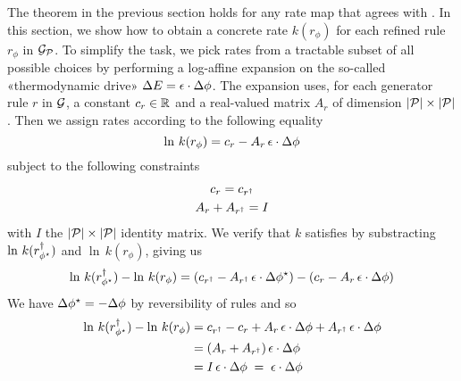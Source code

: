 The theorem in the previous section holds
for any rate map that agrees with .
In this section,
we show how to obtain a concrete rate $k(r_\phi)$
for each refined rule $r_\phi$ in $\mathcal{G}_{\mathcal{P}}$.
To simplify the task, %
we pick rates from a tractable subset of all possible choices
by performing a log-affine expansion on
the so-called «thermodynamic drive»
$\Delta E = \epsilon \cdot \Delta\phi$.
%
The expansion uses,
for each generator rule $r$ in $\mathcal{G}$,
a constant $c_r \in \mathbb{R}$
and a real-valued matrix $A_r$
of dimension $\left\lvert \mathcal{P} \right\rvert \times \left\lvert \mathcal{P} \right\rvert$.
Then we assign rates according to the following equality
\begin{equation}
  \label{eq:lkm}
  \ln\, k(r_\phi) = c_r - A_r\,\epsilon \cdot \Delta\phi
\end{equation}
subject to the following constraints
\begin{gather*}
  c_r = c_{r^\dagger} \\
  A_r + A_{r^\dagger} = I
\end{gather*}
with $I$ the $\left\lvert \mathcal{P} \right\rvert \times \left\lvert \mathcal{P} \right\rvert$ identity matrix.
%
We verify that $k$ satisfies 
by substracting
$\ln\, k(r^\dagger_{\phi^\star})$ and $\ln\, k(r_\phi)$,
giving us
\[ \ln\, k(r^\dagger_{\phi^\star}) - \ln\, k(r_\phi)
   = (c_{r^\dagger} - A_{r^\dagger}\,\epsilon \cdot \Delta\phi^\star)
   - (c_r - A_r\,\epsilon \cdot \Delta\phi) \]
We have $\Delta\phi^\star = -\Delta\phi$
by reversibility of rules
and so
\begin{align*}
  \ln\, k(r^\dagger_{\phi^\star}) - \ln\, k(r_\phi)
  &{}= c_{r^\dagger} - c_r
     + A_r\,\epsilon \cdot \Delta\phi +
       A_{r^\dagger}\,\epsilon \cdot \Delta\phi \\
  &{}= (A_r + A_{r^\dagger})\,\epsilon \cdot \Delta\phi \\
  &{}= I\,\epsilon \cdot \Delta\phi \;=\; \epsilon \cdot \Delta\phi
\end{align*}

